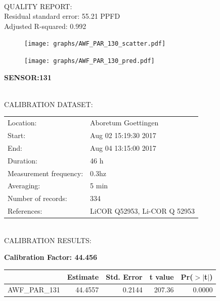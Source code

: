 \documentclass[oneside]{report}
\begin{document}
\hrulefill\\
QUALITY REPORT:\\
Residual standard error: 55.21 PPFD\\
Adjusted R-squared: 0.992



\begin{figure}[H]
  \centering
  \texttt{[image: graphs/AWF\_PAR\_130\_scatter.pdf]}
\end{figure}




\begin{figure}[H]
  \centering
  \texttt{[image: graphs/AWF\_PAR\_130\_pred.pdf]}
\end{figure}

\pagebreak


\begin{center}
\large{\textbf{SENSOR:131}}\\
\end{center}

\hrulefill\\
CALIBRATION DATASET:\\
\begin{table}[h!]
  \centering
  \label{tab:table1}
  \begin{tabular}{ll}
    Location: & Aboretum Goettingen\\ 
    
    
    Start:  & Aug 02 15:19:30 2017 \\
    End:   & Aug 04 13:15:00 2017\\ 
    Duration: & 46 h\\
    Measurement frequency: & 0.3hz\\
    Averaging:  &5 min\\
    Number of records: & 334 \\
    References: & LiCOR Q52953, Li-COR Q 52953 \\
  \end{tabular}
\end{table}

\hrulefill\\
CALIBRATION RESULTS:\\


\begin{center}
\textbf{\large{Calibration Factor: 44.456}}\\
\end{center}
\begin{table}[ht]
\centering
\begin{tabular}{rrrrr}
  \hline
 & Estimate & Std. Error & t value & Pr($>$$|$t$|$) \\ 
  \hline
AWF\_PAR\_131 & 44.4557 & 0.2144 & 207.36 & 0.0000 \\ 
   \hline
\end{tabular}
\end{table}
\end{document}
